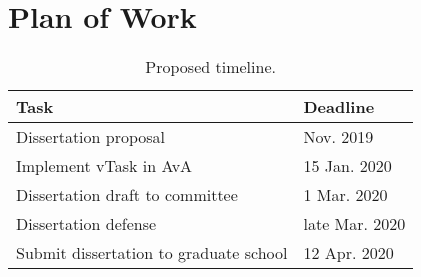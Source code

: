 \section{Plan of Work}
\label{sec:plan}

\begin{table}[ht!]
\centering
\begin{tabular}{ll}
\toprule
Task 											& Deadline \\
\midrule
Dissertation proposal							& Nov. 2019 \\
Implement vTask in AvA 							& 15 Jan. 2020 \\
Dissertation draft to committee					& 1 Mar. 2020 \\
Dissertation defense							& late Mar. 2020 \\
Submit dissertation to graduate school 			& 12 Apr. 2020 \\
\bottomrule
\end{tabular}
\caption{Proposed timeline.}
\label{tab:timeline}
\end{table}